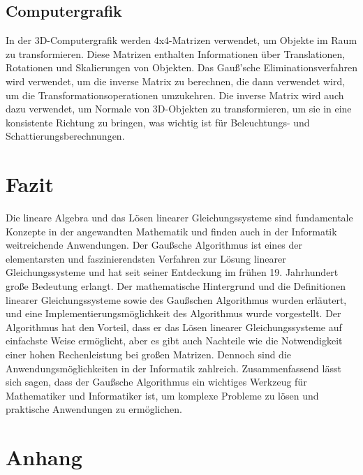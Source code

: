 \documentclass[a4paper, 12pt]{report}
\begin{document}
\section{Computergrafik}
In der 3D-Computergrafik werden 4x4-Matrizen verwendet, um Objekte im Raum zu transformieren.
Diese Matrizen enthalten Informationen über Translationen, Rotationen und Skalierungen von Objekten.
Das Gauß'sche Eliminationsverfahren wird verwendet, um die inverse Matrix zu berechnen, die dann verwendet wird,
um die Transformationsoperationen umzukehren. Die inverse Matrix wird auch dazu verwendet, um Normale von 3D-Objekten zu transformieren,
um sie in eine konsistente Richtung zu bringen, was wichtig ist für Beleuchtungs- und Schattierungsberechnungen.

{\let\clearpage\relax \chapter{Fazit}}
Die lineare Algebra und das Lösen linearer Gleichungssysteme sind fundamentale Konzepte in der angewandten Mathematik
und finden auch in der Informatik weitreichende Anwendungen. Der Gaußsche Algorithmus ist eines der elementarsten und faszinierendsten Verfahren
zur Lösung linearer Gleichungssysteme und hat seit seiner Entdeckung im frühen 19. Jahrhundert große Bedeutung erlangt.
Der mathematische Hintergrund und die Definitionen linearer Gleichungssysteme sowie des Gaußschen Algorithmus wurden
erläutert, und eine Implementierungsmöglichkeit des Algorithmus wurde vorgestellt.
Der Algorithmus hat den Vorteil, dass er das Lösen linearer Gleichungssysteme auf einfachste Weise ermöglicht,
aber es gibt auch Nachteile wie die Notwendigkeit einer hohen Rechenleistung bei großen Matrizen.
Dennoch sind die Anwendungsmöglichkeiten in der Informatik zahlreich.
Zusammenfassend lässt sich sagen, dass der Gaußsche Algorithmus ein wichtiges Werkzeug für
Mathematiker und Informatiker ist, um komplexe Probleme zu lösen und praktische Anwendungen zu ermöglichen.


{\let\clearpage\relax\chapter*{Anhang}}
\footnotesize

\printbibliography
\end{document}

